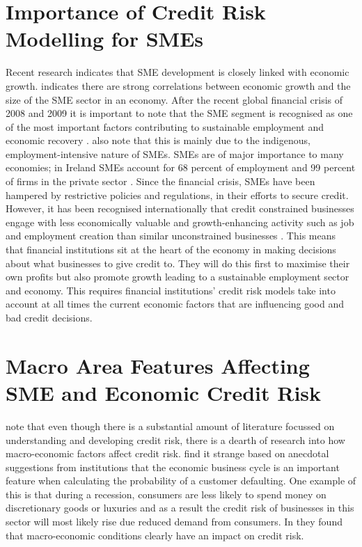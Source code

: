 \section{Importance of Credit Risk Modelling for SMEs}
Recent research indicates that SME development is closely linked with economic growth. \cite{beck_smes_2005} indicates there are strong correlations between economic growth and the size of the SME sector in an economy. After the recent global financial crisis of 2008 and 2009 it is important to note that the SME segment is recognised as one of the most important factors contributing to sustainable employment and economic recovery \citep{lawless_smes_2012}. \cite{lawless_smes_2012} also note that this is mainly due to the indigenous, employment-intensive nature of SMEs. SMEs are of major importance to many economies; in Ireland SMEs account for 68 percent of employment and 99 percent of firms in the private sector \citep{lawless_irish_2012}. Since the financial crisis, SMEs have been hampered by restrictive policies and regulations, in their efforts to secure credit. However, it has been recognised internationally that credit constrained businesses engage with less economically valuable and growth-enhancing activity such as job and employment creation than similar unconstrained businesses \citep{campello_real_2010}. This means that financial institutions sit at the heart of the economy in making decisions about what businesses to give credit to. They will do this first to maximise their own profits but also promote growth leading to a sustainable employment sector and economy. This requires financial institutions' credit risk models take into account at all times the current economic factors that are influencing good and bad credit decisions. 

\section{Macro Area Features Affecting SME and Economic Credit Risk}
\cite{hackbarth_capital_2006} note that even though there is a substantial amount of literature focussed on understanding and developing credit risk, there is a dearth of research into how macro-economic factors affect credit risk.  \cite{hackbarth_capital_2006} find it strange based on anecdotal suggestions from institutions that the economic business cycle is an important feature when calculating the probability of a customer defaulting. One example of this is that during a recession, consumers are less likely to spend money on discretionary goods or luxuries and as a result the credit risk of businesses in this sector will most likely rise due reduced demand from consumers. In \cite{hackbarth_capital_2006} they found that macro-economic conditions clearly have an impact on credit risk.

